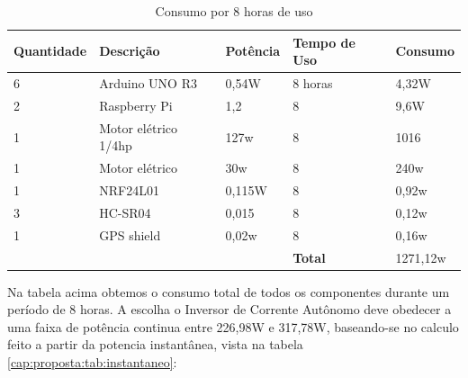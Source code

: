 \begin{table}[]
\centering
\caption{Consumo por 8 horas de uso}
\label{cap:proposta:tab:quantificar}
\begin{tabular}{lll|l|l|}
\hline
\multicolumn{1}{|l|}{\textbf{Quantidade}} & \multicolumn{1}{l|}{\textbf{Descrição}}   & \textbf{Potência} & \textbf{Tempo de Uso} & \textbf{Consumo} \\ \hline
\multicolumn{1}{|l|}{6}                   & \multicolumn{1}{l|}{Arduino UNO R3}       & 0,54W             & 8 horas               & 4,32W            \\ \hline
\multicolumn{1}{|l|}{2}                   & \multicolumn{1}{l|}{Raspberry Pi}         & 1,2               & 8                     & 9,6W             \\ \hline
\multicolumn{1}{|l|}{1}                   & \multicolumn{1}{l|}{Motor elétrico 1/4hp} & 127w             & 8                     & 1016         \\ \hline
\multicolumn{1}{|l|}{1}                   & \multicolumn{1}{l|}{Motor elétrico}       & 30w               & 8                     & 240w             \\ \hline
\multicolumn{1}{|l|}{1}                   & \multicolumn{1}{l|}{NRF24L01}             & 0,115W            & 8                     & 0,92w            \\ \hline
\multicolumn{1}{|l|}{3}                   & \multicolumn{1}{l|}{HC-SR04}              & 0,015             & 8                     & 0,12w            \\ \hline
\multicolumn{1}{|l|}{1}                   & \multicolumn{1}{l|}{GPS shield}           & 0,02w             & 8                     & 0,16w            \\ \hline
                                          &                                           &                   & \textbf{Total}        & 1271,12w      \\ \cline{4-5} 
\end{tabular}
\end{table}

Na tabela acima obtemos o consumo total de todos os componentes durante um período de 8 horas. A escolha o Inversor de Corrente Autônomo deve obedecer a uma faixa de potência continua entre 226,98W e 317,78W, baseando-se no calculo feito a partir da potencia instantânea, vista na tabela \ref{cap:proposta:tab:instantaneo}: 

